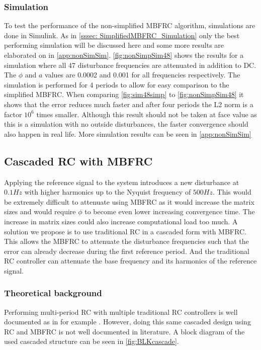 \documentclass[journal]{IEEEtran}
\begin{document}
\subsubsection{Simulation}\label{sssec: NonSimplifiedMBFRC_Simulation}
To test the performance of the non-simplified MBFRC algorithm, simulations are done in Simulink. As in \autoref{sssec: SimplifiedMBFRC_Simulation} only the best performing simulation will be discussed here and some more results are elaborated on in \autoref{app:nonSimSim}. \autoref{fig:nonSimpSim48} shows the results for a simulation where all 47 disturbance frequencies are attenuated in addition to DC. The $\phi$ and $a$ values are 0.0002 and 0.001 for all frequencies respectively. The simulation is performed for 4 periods to allow for easy comparison to the simplified MBFRC. When comparing \autoref{fig:sim48simp} to \autoref{fig:nonSimpSim48} it shows that the error reduces much faster and after four periods the L2 norm is a factor \(10^6\) times smaller. Although this result should not be taken at face value as this is a simulation with no outside disturbances, the faster convergence should also happen in real life. More simulation results can be seen in \autoref{app:nonSimSim}



\subsection{Cascaded RC with MBFRC}\label{ssec:cascadedRC}
Applying the reference signal to the system introduces a new disturbance at $0.1 Hz$ with higher harmonics up to the Nyquist frequency of $500 Hz$. This would be extremely difficult to attenuate using MBFRC as it would increase the matrix sizes and would require $\phi$ to become even lower increasing convergence time. The increase in matrix sizes could also increase computational load too much. A solution we propose is to use traditional RC in a cascaded form with MBFRC. This allows the MBFRC to attenuate the disturbance frequencies such that the error can already decrease during the first reference period. And the traditional RC controller can attenuate the base frequency and its harmonics of the reference signal.



\subsubsection{Theoretical background}
Performing multi-period RC with multiple traditional RC controllers is well documented as in for example \cite{SequentialRC}. However, doing this same cascaded design using RC and MBFRC is not well documented in literature. A block diagram of the used cascaded structure can be seen in \autoref{fig:BLKcascade}.
\end{document}
